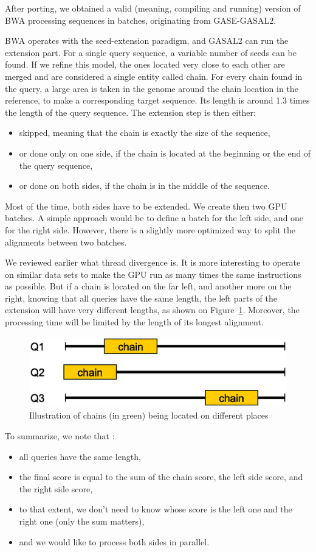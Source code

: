 After porting, we obtained a valid (meaning, compiling and running) version of BWA processing sequences in batches, originating from GASE-GASAL2.

BWA operates with the seed-extension paradigm, and GASAL2 can run the extension part. For a single query sequence, a variable number of seeds can be found. If we refine this model, the ones located very close to each other are merged and are considered a single entity called chain. For every chain found in the query, a large area is taken in the genome around the chain location in the reference, to make a corresponding target sequence. Its length is around 1.3 times the length of the query sequence. The extension step is then either:

\begin{itemize}
	\item skipped, meaning that the chain is exactly the size of the sequence,
	\item or done only on one side, if the chain is located at the beginning or the end of the query sequence,
	\item or done on both sides, if the chain is in the middle of the sequence.
\end{itemize}

Most of the time, both sides have to be extended. We create then two GPU batches. A simple approach would be to define a batch for the left side, and one for the right side. However, there is a slightly more optimized way to split the alignments between two batches.

We reviewed earlier what thread divergence is. It is more interesting to operate on similar data sets to make the GPU run as many times the same instructions as possible. But if a chain is located on the far left, and another more on the right, knowing that all queries have the same length, the left parts of the extension will have very different lengths, as shown on Figure~\ref{fig:seds-different-chains}. Moreover, the processing time will be limited by the length of its longest alignment. 
\begin{figure}[h!]
	\centering
	\includegraphics[width=0.7\linewidth]{seds-different-chains}
	\caption{Illustration of chains (in green) being located on different places}
	\label{fig:seds-different-chains}
\end{figure}
To summarize, we note that :
\begin{itemize}
	\item all queries have the same length,
	\item the final score is equal to the sum of the chain score, the left side score, and the right side score,
	\item to that extent, we don't need to know whose score is the left one and the right one (only the sum matters),
	\item and we would like to process both sides in parallel.
\end{itemize}

